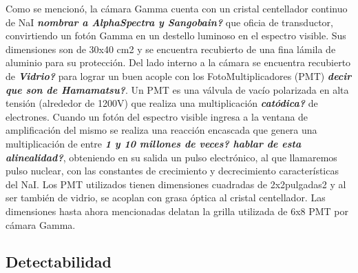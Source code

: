 \documentclass[conference]{IEEEtran}
\begin{document}
Como se mencionó, la cámara Gamma cuenta con un cristal centellador continuo de NaI \textit{\textbf{nombrar a AlphaSpectra y Sangobain?}} que oficia de transductor, convirtiendo un fotón Gamma en un destello luminoso en el espectro visible. Sus dimensiones son de 30x40 cm2 y se encuentra recubierto de una fina lámila de aluminio para su protección. Del lado interno a la cámara se encuentra recubierto de \textit{\textbf{Vidrio?}} para lograr un buen acople con los FotoMultiplicadores (PMT) \textit{\textbf{decir que son de Hamamatsu?}}.
Un PMT es una válvula de vacío polarizada en alta tensión (alrededor de 1200V) que realiza una multiplicación \textit{\textbf{catódica?}} de electrones. Cuando un fotón del espectro visible ingresa a la ventana de amplificación del mismo se realiza una reacción encascada que genera una multiplicación de entre \textit{\textbf{1 y 10 millones de veces? hablar de esta alinealidad?}}, obteniendo en su salida un pulso electrónico, al que llamaremos pulso nuclear, con las constantes de crecimiento y decrecimiento características del NaI.
Los PMT utilizados tienen dimensiones cuadradas de 2x2pulgadas2 y al ser también de vidrio, se acoplan con grasa óptica al cristal centellador. Las dimensiones hasta ahora mencionadas delatan la grilla utilizada de 6x8 PMT por cámara Gamma.

\subsection{Detectabilidad}

\end{document}
